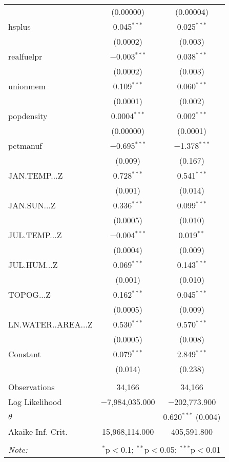 \begin{table}[!htbp]
\begin{tabular}{@{\extracolsep{5pt}}lcc}
  & (0.00000) & (0.00004) \\ 
  hsplus & 0.045$^{***}$ & 0.025$^{***}$ \\ 
  & (0.0002) & (0.003) \\ 
  realfuelpr & $-$0.003$^{***}$ & 0.038$^{***}$ \\ 
  & (0.0002) & (0.003) \\ 
  unionmem & 0.109$^{***}$ & 0.060$^{***}$ \\ 
  & (0.0001) & (0.002) \\ 
  popdensity & 0.0004$^{***}$ & 0.002$^{***}$ \\ 
  & (0.00000) & (0.0001) \\ 
  pctmanuf & $-$0.695$^{***}$ & $-$1.378$^{***}$ \\ 
  & (0.009) & (0.167) \\ 
  JAN.TEMP...Z & 0.728$^{***}$ & 0.541$^{***}$ \\ 
  & (0.001) & (0.014) \\ 
  JAN.SUN...Z & 0.336$^{***}$ & 0.099$^{***}$ \\ 
  & (0.0005) & (0.010) \\ 
  JUL.TEMP...Z & $-$0.004$^{***}$ & 0.019$^{**}$ \\ 
  & (0.0004) & (0.009) \\ 
  JUL.HUM...Z & 0.069$^{***}$ & 0.143$^{***}$ \\ 
  & (0.001) & (0.010) \\ 
  TOPOG...Z & 0.162$^{***}$ & 0.045$^{***}$ \\ 
  & (0.0005) & (0.009) \\ 
  LN.WATER..AREA...Z & 0.530$^{***}$ & 0.570$^{***}$ \\ 
  & (0.0005) & (0.008) \\ 
  Constant & 0.079$^{***}$ & 2.849$^{***}$ \\ 
  & (0.014) & (0.238) \\ 
 \hline \\[-1.8ex] 
Observations & 34,166 & 34,166 \\ 
Log Likelihood & $-$7,984,035.000 & $-$202,773.900 \\ 
$\theta$ &  & 0.620$^{***}$  (0.004) \\ 
Akaike Inf. Crit. & 15,968,114.000 & 405,591.800 \\ 
\hline 
\hline \\[-1.8ex] 
\textit{Note:}  & \multicolumn{2}{r}{$^{*}$p$<$0.1; $^{**}$p$<$0.05; $^{***}$p$<$0.01} \\ 
\end{tabular} 
\end{table} 
